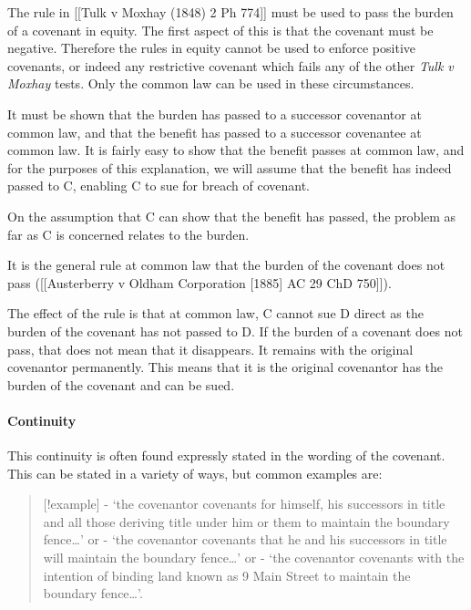 \documentclass[
]{article}
\newenvironment{Shaded}{}{}
\newcommand{\NormalTok}[1]{#1}
\begin{document}
The rule in {[}{[}Tulk v Moxhay (1848) 2 Ph 774{]}{]} must be used to
pass the burden of a covenant in equity. The first aspect of this is
that the covenant must be negative. Therefore the rules in equity cannot
be used to enforce positive covenants, or indeed any restrictive
covenant which fails any of the other \emph{Tulk v Moxhay} tests. Only
the common law can be used in these circumstances.

It must be shown that the burden has passed to a successor covenantor at
common law, and that the benefit has passed to a successor covenantee at
common law. It is fairly easy to show that the benefit passes at common
law, and for the purposes of this explanation, we will assume that the
benefit has indeed passed to C, enabling C to sue for breach of
covenant.

On the assumption that C can show that the benefit has passed, the
problem as far as C is concerned relates to the burden.

\begin{Shaded}
\begin{Highlighting}[]
\NormalTok{It is the general rule at common law that the burden of the covenant does not pass ([[Austerberry v Oldham Corporation [1885] AC 29 ChD 750]]).}
\end{Highlighting}
\end{Shaded}

The effect of the rule is that at common law, C cannot sue D direct as
the burden of the covenant has not passed to D. If the burden of a
covenant does not pass, that does not mean that it disappears. It
remains with the original covenantor permanently. This means that it is
the original covenantor has the burden of the covenant and can be sued.

\hypertarget{continuity}{%
\paragraph{Continuity}\label{continuity}}

This continuity is often found expressly stated in the wording of the
covenant. This can be stated in a variety of ways, but common examples
are:

\begin{quote}
{[}!example{]} - `the covenantor covenants for himself, his successors
in title and all those deriving title under him or them to maintain the
boundary fence\ldots{}' or - `the covenantor covenants that he and his
successors in title will maintain the boundary fence\ldots{}' or - `the
covenantor covenants with the intention of binding land known as 9 Main
Street to maintain the boundary fence\ldots{}'.
\end{quote}
\end{document}
